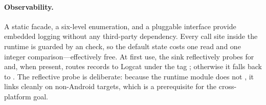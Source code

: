 \paragraph{Observability.} A  static facade, a six-level  enumeration, and a pluggable  interface provide embedded logging without any third-party dependency. Every call site inside the runtime is guarded by an  check, so the default  state costs one  read and one integer comparison---effectively free. At first use, the sink reflectively probes for  and, when present, routes records to Logcat under the tag ; otherwise it falls back to . The reflective probe is deliberate: because the runtime module does not , it links cleanly on non-Android \jvm targets, which is a prerequisite for the cross-platform goal.
